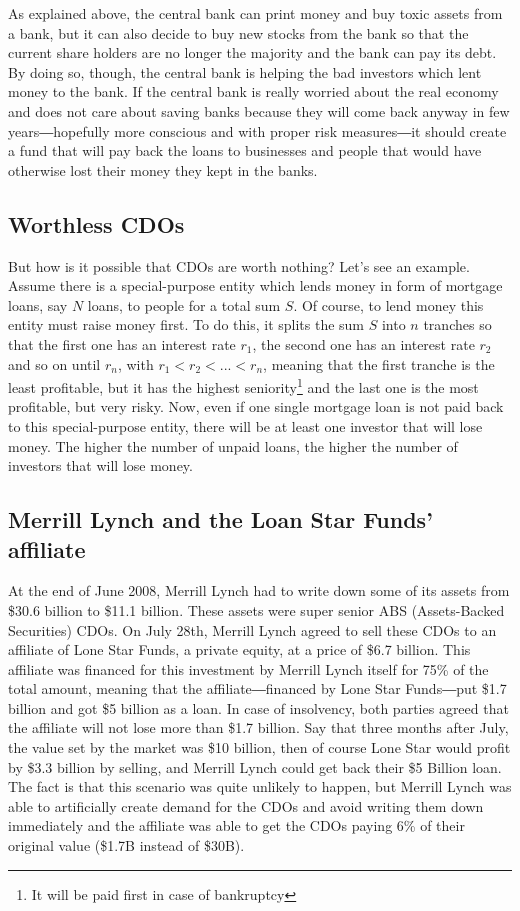 As explained above, the central bank can print money and buy toxic assets from a bank, but it can also decide to buy new stocks from the bank so that the current share holders are no longer the majority and the bank can pay its debt. By doing so, though, the central bank is helping the bad investors which lent money to the bank. If the central bank is really worried about the real economy and does not care about saving banks because they will come back anyway in few years―hopefully more conscious and with proper risk measures―it should create a fund that will pay back the loans to businesses and people that would have otherwise lost their money they kept in the banks.

\subsection{Worthless CDOs}
But how is it possible that CDOs are worth nothing? Let's see an example. Assume there is a special-purpose entity which lends money in form of mortgage loans, say $N$ loans, to people for a total sum $S$. Of course, to lend money this entity must raise money first. To do this, it splits the sum $S$ into $n$ tranches so that the first one has an interest rate $r_1$, the second one has an interest rate $r_2$ and so on until $r_n$, with $r_1 < r_2 < ... < r_n$, meaning that the first tranche is the least profitable, but it has the highest seniority\footnote{It will be paid first in case of bankruptcy} and the last one is the most profitable, but very risky. Now, even if one single mortgage loan is not paid back to this special-purpose entity, there will be at least one investor that will lose money. The higher the number of unpaid loans, the higher the number of investors that will lose money.

\subsection{Merrill Lynch and the Loan Star Funds' affiliate}
At the end of June 2008, Merrill Lynch had to write down some of its assets from \$30.6 billion to \$11.1 billion. These assets were super senior ABS (Assets-Backed Securities) CDOs. On July 28th, Merrill Lynch agreed to sell these CDOs to an affiliate of Lone Star Funds, a private equity, at a price of \$6.7 billion. This affiliate was financed for this investment by Merrill Lynch itself for 75\% of the total amount, meaning that the affiliate―financed by Lone Star Funds―put \$1.7 billion and got \$5 billion as a loan. In case of insolvency, both parties agreed that the affiliate will not lose more than \$1.7 billion. Say that three months after July, the value set by the market was \$10 billion, then of course Lone Star would profit by \$3.3 billion by selling, and Merrill Lynch could get back their \$5 Billion loan. The fact is that this scenario was quite unlikely to happen, but Merrill Lynch was able to artificially create demand for the CDOs and avoid writing them down immediately and the affiliate was able to get the CDOs paying 6\% of their original value (\$1.7B instead of \$30B).

